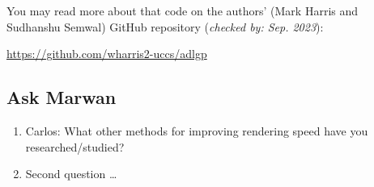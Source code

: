 You may read more about that code on the authors' (Mark Harris and Sudhanshu Semwal) GitHub repository (\textit{checked by: Sep. 2023}):

\url{https://github.com/wharris2-uccs/adlgp}

\subsection{Ask Marwan}

\begin{enumerate}[label={Question \arabic*.}]
    \item Carlos: What other methods for improving rendering speed have you researched/studied?
    \item Second question \dots
\end{enumerate}
